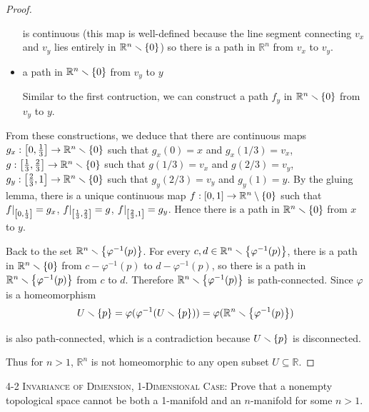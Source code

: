 \begin{proof}
\begin{itemize}
		      is continuous (this map is well-defined because the line segment connecting $v_{x}$ and $v_{y}$ lies entirely in $\mathbb{R}^{n}\smallsetminus\set{0}$) so there is a path in $\mathbb{R}^{n}$ from $v_{x}$ to $v_{y}$.
		\item a path in $\mathbb{R}^{n}\smallsetminus\set{0}$ from $v_{y}$ to $y$

		      Similar to the first contruction, we can construct a path $f_{y}$ in $\mathbb{R}^{n}\smallsetminus\set{0}$ from $v_{y}$ to $y$.
	\end{itemize}

	From these constructions, we deduce that there are continuous maps $g_{x}: \left[{0, \frac{1}{3}}\right] \to \mathbb{R}^{n}\smallsetminus\left\{{0}\right\}$ such that $g_{x}(0) = x$ and $g_{x}(1/3) = v_{x}$, $g: \left[{\frac{1}{3}, \frac{2}{3}}\right] \to \mathbb{R}^{n}\smallsetminus\left\{{0}\right\}$ such that $g(1/3) = v_{x}$ and $g(2/3) = v_{y}$, $g_{y}: \left[{\frac{2}{3}, 1}\right] \to \mathbb{R}^{n}\smallsetminus\left\{{0}\right\}$ such that $g_{y}(2/3) = v_{y}$ and $g_{y}(1) = y$. By the gluing lemma, there is a unique continuous map $f: \left[{0, 1}\right] \to \mathbb{R}^{n}\setminus \left\{{0}\right\}$ such that $f\vert_{\left[{0, \frac{1}{3}}\right]} = g_{x}$, $f\vert_{\left[{\frac{1}{3}, \frac{2}{3}}\right]} = g$, $f\vert_{\left[{\frac{2}{3}, 1}\right]} = g_{y}$. Hence there is a path in $\mathbb{R}^{n}\smallsetminus\set{0}$ from $x$ to $y$.

	Back to the set $\mathbb{R}^{n}\smallsetminus\left\{{\varphi^{-1}(p)}\right\}$. For every $c, d \in \mathbb{R}^{n}\smallsetminus\left\{{\varphi^{-1}(p)}\right\}$, there is a path in $\mathbb{R}^{n}\smallsetminus\set{0}$ from $c - \varphi^{-1}(p)$ to $d - \varphi^{-1}(p)$, so there is a path in $\mathbb{R}^{n}\smallsetminus\left\{{\varphi^{-1}(p)}\right\}$ from $c$ to $d$. Therefore $\mathbb{R}^{n}\smallsetminus\left\{{\varphi^{-1}(p)}\right\}$ is path-connected. Since $\varphi$ is a homeomorphism
	\begin{equation*}
		U\smallsetminus\left\{{p}\right\} = \varphi(\varphi^{-1}(U\smallsetminus\left\{{p}\right\})) = \varphi(\mathbb{R}^{n}\smallsetminus\left\{{\varphi^{-1}(p)}\right\})
	\end{equation*}

	is also path-connected, which is a contradiction because $U\smallsetminus\left\{{p}\right\}$ is disconnected.

	Thus for $n > 1$, $\mathbb{R}^{n}$ is not homeomorphic to any open subset $U\subseteq \mathbb{R}$.
\end{proof}

\begin{problem}{4-2}\label{problem:4-2}
\textsc{Invariance of Dimension, 1-Dimensional Case:} Prove that a nonempty topological space cannot be both a 1-manifold and an $n$-manifold for some $n > 1$.
\end{problem}

